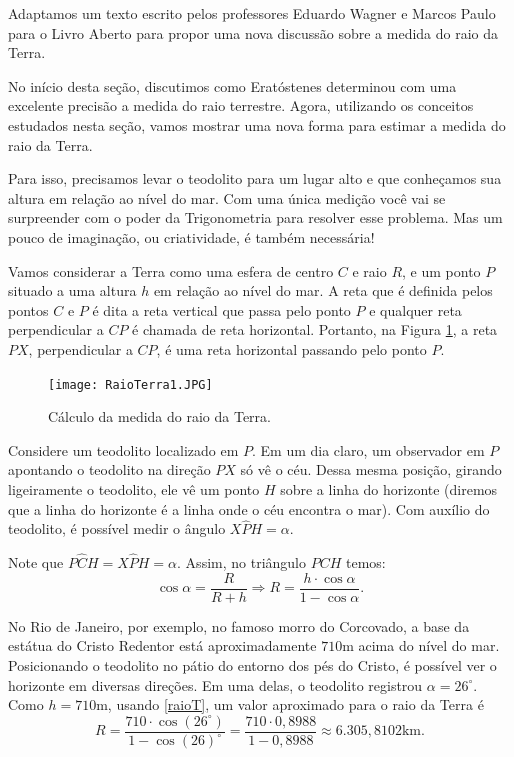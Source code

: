 
Adaptamos um texto escrito pelos professores Eduardo Wagner e Marcos Paulo para o Livro Aberto para propor uma nova discussão sobre a medida do raio da Terra.

No início desta seção, discutimos como Eratóstenes determinou com uma excelente precisão a medida do raio terrestre. Agora, utilizando os conceitos estudados nesta seção, vamos mostrar  uma nova forma para estimar a medida do raio da Terra. 
        
Para isso, precisamos levar o teodolito para um lugar alto e que conheçamos sua altura em relação ao nível do mar. Com uma única medição você vai se surpreender com o poder da Trigonometria para resolver esse problema. Mas um pouco de imaginação, ou criatividade, é também necessária!

Vamos considerar a Terra como uma esfera de centro $C$ e raio $R$, e um ponto $P$ situado a uma altura $h$ em relação ao nível do mar. A reta que é definida pelos pontos $C$ e $P$ é dita a reta vertical que passa pelo ponto $P$ e qualquer reta perpendicular a $CP$ é chamada de reta horizontal. Portanto, na Figura \ref{RaioTerra}, a reta $PX$, perpendicular a $CP$, é uma reta horizontal passando pelo ponto $P$.

   \begin{figure}[H]
    \centering
    \texttt{[image: RaioTerra1.JPG]}
    \caption{Cálculo da medida do raio da Terra.}
    \label{RaioTerra}
\end{figure}



Considere um teodolito localizado em $P$. Em um dia claro, um observador em $P$ apontando o teodolito na direção $PX$ só vê o céu. Dessa mesma posição, girando ligeiramente o teodolito, ele vê um ponto $H$ sobre a linha do horizonte (diremos que a linha do horizonte é a linha onde o céu encontra o mar). Com auxílio do teodolito, é possível medir o ângulo $X\hat{P}H=\alpha$.

Note que $P\hat{C}H=X\hat{P}H=\alpha$. Assim, no triângulo $PCH$ temos:
\begin{equation}\label{raioT}
\cos\alpha=\frac{R}{R+h} \Rightarrow R=\frac{h\cdot\cos\alpha}{1-\cos\alpha}.
\end{equation}

No Rio de Janeiro, por exemplo, no famoso morro do Corcovado, a base da estátua do Cristo Redentor está aproximadamente $710$m acima do nível do mar. Posicionando o teodolito no pátio do entorno dos pés do Cristo, é possível ver o horizonte em diversas direções. Em uma delas, o teodolito registrou $\alpha=26^\circ$. Como $h=710$m, usando \eqref{raioT}, um valor aproximado para o raio da Terra é 
$$R=\frac{710\cdot\cos(26^\circ)}{1-\cos(26)^\circ}=\frac{710\cdot0,8988}{1-0,8988}\approx 6.305,8102\text{km}.$$

